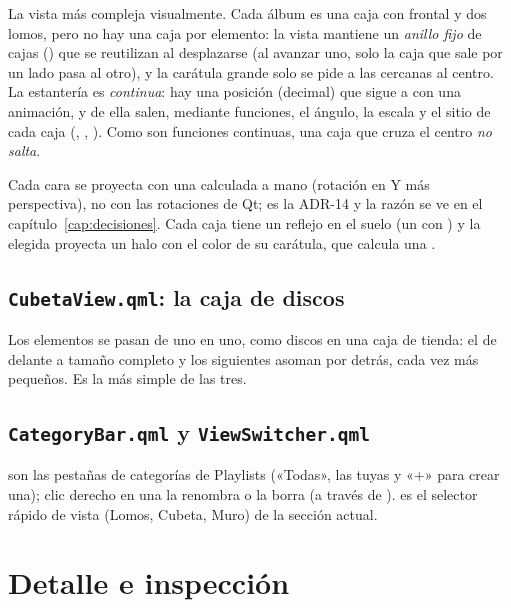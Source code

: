 La vista más compleja visualmente. Cada álbum es una caja con frontal y dos lomos, pero no hay
una caja por elemento: la vista mantiene un \emph{anillo fijo} de cajas () que se
reutilizan al desplazarse (al avanzar uno, solo la caja que sale por un lado pasa al otro), y la
carátula grande solo se pide a las cercanas al centro. La
estantería es \emph{continua}: hay una posición  (decimal) que sigue a  con
una animación, y de ella salen, mediante funciones, el ángulo, la escala y el sitio de cada caja
(, , ). Como son funciones continuas, una caja que
cruza el centro \emph{no salta}.

Cada cara se proyecta con una  calculada a mano (rotación en Y más
perspectiva), no con las rotaciones de Qt; es la ADR-14 y la razón se ve en el capítulo~\ref{cap:decisiones}.
Cada caja tiene un reflejo en el suelo (un  con ) y la
elegida proyecta un halo con el color de su carátula, que calcula una .

\subsection{\texttt{CubetaView.qml}: la caja de discos}

Los elementos se pasan de uno en uno, como discos en una caja de tienda: el de delante a
tamaño completo y los siguientes asoman por detrás, cada vez más pequeños. Es la más simple de
las tres.

\subsection{\texttt{CategoryBar.qml} y \texttt{ViewSwitcher.qml}}

 son las pestañas de categorías de Playlists («Todas», las tuyas y «+» para
crear una); clic derecho en una la renombra o la borra (a través de ).
 es el selector rápido de vista (Lomos, Cubeta, Muro) de la sección actual.

\section{Detalle e inspección}

